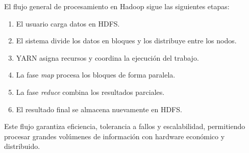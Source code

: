 El flujo general de procesamiento en Hadoop sigue las siguientes etapas:

\begin{enumerate}
    \item El usuario carga datos en HDFS.
    \item El sistema divide los datos en bloques y los distribuye entre los nodos.
    \item YARN asigna recursos y coordina la ejecución del trabajo.
    \item La fase \textit{map} procesa los bloques de forma paralela.
    \item La fase \textit{reduce} combina los resultados parciales.
    \item El resultado final se almacena nuevamente en HDFS.
\end{enumerate}

Este flujo garantiza eficiencia, tolerancia a fallos y escalabilidad, permitiendo procesar grandes volúmenes de información con hardware económico y distribuido.
